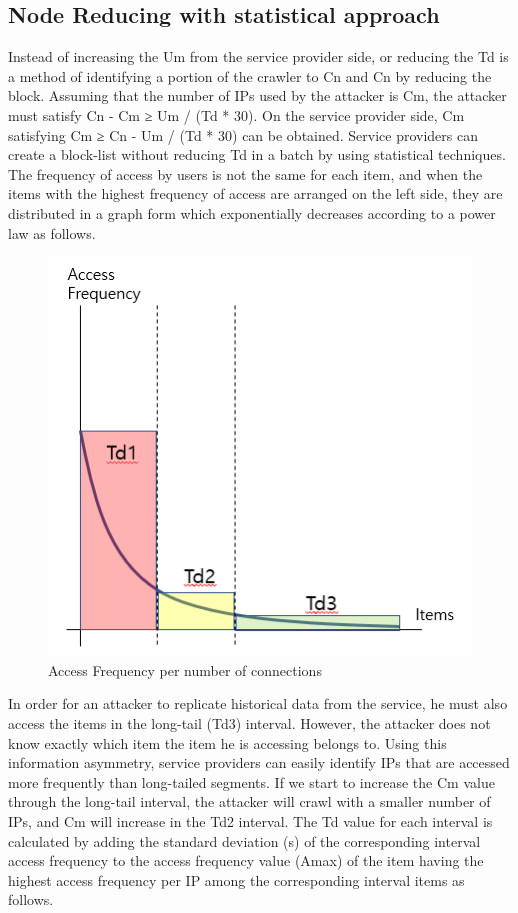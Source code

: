 \subsection{Node Reducing with statistical approach}
Instead of increasing the Um from the service provider side, or reducing the Td is a method of identifying a portion of the crawler to Cn and Cn by reducing the block.
Assuming that the number of IPs used by the attacker is Cm, the attacker must satisfy Cn - Cm ≥ Um / (Td * 30). On the service provider side, Cm satisfying Cm ≥ Cn - Um / (Td * 30) can be obtained.
Service providers can create a block-list without reducing Td in a batch by using statistical techniques. The frequency of access by users is not the same for each item, and when the items with the highest frequency of access are arranged on the left side, they are distributed in a graph form which exponentially decreases according to a power law as follows.

\begin{figure}[H]
    \includegraphics[width=1.0\columnwidth]{figs/figure_01.png}
    \caption{Access Frequency per number of connections}
    \label{fig:my_label}
\end{figure}

In order for an attacker to replicate historical data from the service, he must also access the items in the long-tail (Td3) interval. However, the attacker does not know exactly which item the item he is accessing belongs to. Using this information asymmetry, service providers can easily identify IPs that are accessed more frequently than long-tailed segments. If we start to increase the Cm value through the long-tail interval, the attacker will crawl with a smaller number of IPs, and Cm will increase in the Td2 interval.
The Td value for each interval is calculated by adding the standard deviation (s) of the corresponding interval access frequency to the access frequency value (Amax) of the item having the highest access frequency per IP among the corresponding interval items as follows. 

